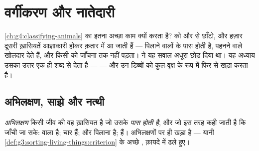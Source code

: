 \chapter{वर्गीकरण और नातेदारी}\label{ch:g6:classification-kinship}

\cref{ch:g4:classifying-animals} का 
इतना अच्छा काम क्यों करता है?  को  और  से छाँटो, और
हज़ार दूसरी ख़ासियतें आज्ञाकारी होकर क़तार में आ जाती हैं --- 
पिलाने वालों के पास  होती है,  पहनने वाले खोलदार  देते हैं,
और किसी को जाँचना तक नहीं पड़ता।
 ने यह सवाल अधूरा छोड़ दिया था।
यह अध्याय उसका उत्तर एक ही शब्द से देता है ---  --- और उन
डिब्बों को कुल-वृक्ष के रूप में फिर से खड़ा करता है।

\section{अभिलक्षण, साझे और नत्थी}

\begin{definition}[अभिलक्षण]\label{def:g6:classification-kinship:attribute}
\emph{अभिलक्षण} किसी जीव की वह ख़ासियत है जो उसके
\emph{पास होती है}, और जो इस तरह कही जाती है कि जाँची जा सके:  वाला
 है; चार  हैं;  और  पिलाना है;  हैं। 
अभिलक्षणों पर ही खड़ा है --- यानी
\cref{def:g3:sorting-living-things:criterion} के अच्छे , क़ायदे
में ढले हुए।
\end{definition}

